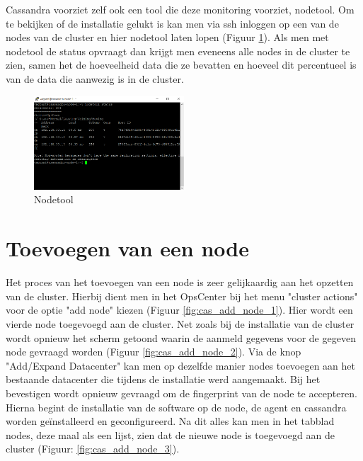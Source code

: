 Cassandra voorziet zelf ook een tool die deze monitoring voorziet, nodetool.
Om te bekijken of de installatie gelukt is kan men via ssh inloggen op een van de nodes van de cluster en hier nodetool laten lopen (Figuur \ref{fig:cas_nodetool}).
Als men met nodetool de status opvraagt dan krijgt men eveneens alle nodes in de cluster te zien, samen het de hoeveelheid data die ze bevatten en hoeveel dit percentueel is van de data die aanwezig is in de cluster.

\begin{figure}[H]
	\centering
	\includegraphics[width=0.5\textwidth]{img/4_installatie_cassandra/3_Node_setup}
	\caption{Nodetool}
	\label{fig:cas_nodetool}
\end{figure}

\section{Toevoegen van een node}
Het proces van het toevoegen van een node is zeer gelijkaardig aan het opzetten van de cluster.
Hierbij dient men in het OpsCenter bij het menu "cluster actions" voor de optie "add node" kiezen (Figuur \ref{fig:cas_add_node_1}).
Hier wordt een vierde node toegevoegd aan de cluster.
Net zoals bij de installatie van de cluster wordt opnieuw het scherm getoond waarin de aanmeld gegevens voor de gegeven node gevraagd worden (Figuur \ref{fig:cas_add_node_2}).
Via de knop "Add/Expand Datacenter" kan men op dezelfde manier nodes toevoegen aan het bestaande datacenter die tijdens de installatie werd aangemaakt.
Bij het bevestigen wordt opnieuw gevraagd om de fingerprint van de node te accepteren.
Hierna begint de installatie van de software op de node, de agent en cassandra worden geïnstalleerd en geconfigureerd.
Na dit alles kan men in het tabblad nodes, deze maal als een lijst, zien dat de nieuwe node is toegevoegd aan de cluster (Figuur: \ref{fig:cas_add_node_3}).

